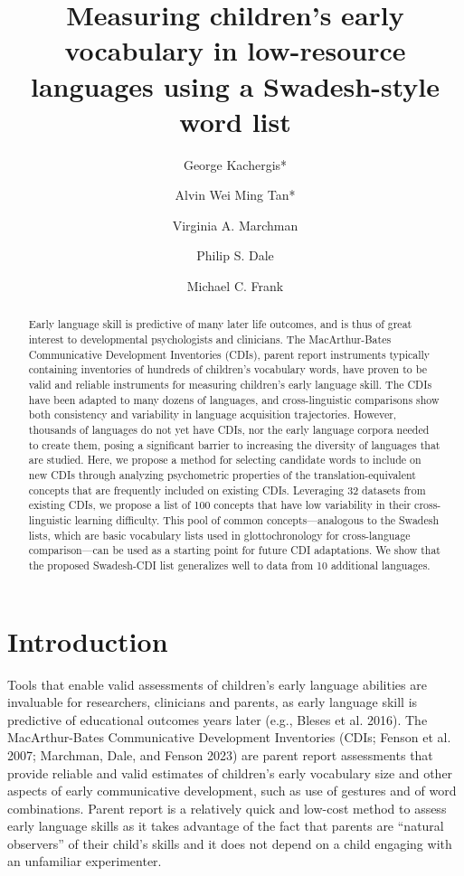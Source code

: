 \documentclass[
  letterpaper,
  DIV=11,
  numbers=noendperiod]{scrartcl}
\title{Measuring children's early vocabulary in low-resource languages
using a Swadesh-style word list}
\author{George Kachergis* \and Alvin Wei Ming Tan* \and Virginia A.
Marchman \and Philip S. Dale \and Michael C. Frank}
\date{}
\begin{document}
\maketitle
\begin{abstract}
Early language skill is predictive of many later life outcomes, and is
thus of great interest to developmental psychologists and clinicians.
The MacArthur-Bates Communicative Development Inventories (CDIs), parent
report instruments typically containing inventories of hundreds of
children's vocabulary words, have proven to be valid and reliable
instruments for measuring children's early language skill. The CDIs have
been adapted to many dozens of languages, and cross-linguistic
comparisons show both consistency and variability in language
acquisition trajectories. However, thousands of languages do not yet
have CDIs, nor the early language corpora needed to create them, posing
a significant barrier to increasing the diversity of languages that are
studied. Here, we propose a method for selecting candidate words to
include on new CDIs through analyzing psychometric properties of the
translation-equivalent concepts that are frequently included on existing
CDIs. Leveraging 32 datasets from existing CDIs, we propose a list of
100 concepts that have low variability in their cross-linguistic
learning difficulty. This pool of common concepts---analogous to the
Swadesh lists, which are basic vocabulary lists used in glottochronology
for cross-language comparison---can be used as a starting point for
future CDI adaptations. We show that the proposed Swadesh-CDI list
generalizes well to data from 10 additional languages.
\end{abstract}


\section{Introduction}\label{introduction}

Tools that enable valid assessments of children's early language
abilities are invaluable for researchers, clinicians and parents, as
early language skill is predictive of educational outcomes years later
(e.g., Bleses et al. 2016). The MacArthur-Bates Communicative
Development Inventories (CDIs; Fenson et al. 2007; Marchman, Dale, and
Fenson 2023) are parent report assessments that provide reliable and
valid estimates of children's early vocabulary size and other aspects of
early communicative development, such as use of gestures and of word
combinations. Parent report is a relatively quick and low-cost method to
assess early language skills as it takes advantage of the fact that
parents are ``natural observers'' of their child's skills and it does
not depend on a child engaging with an unfamiliar experimenter.
\end{document}
